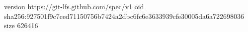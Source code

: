 version https://git-lfs.github.com/spec/v1
oid sha256:927501f9c7ced71150756b7424a2dbc6fc6e3633939cfe30005da6a722698036
size 626416
